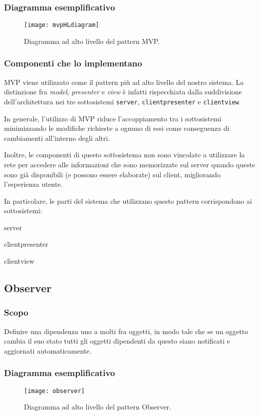 \subsubsection{Diagramma esemplificativo}
\begin{figure}[h]
\centering
\texttt{[image: mvpHLdiagram]}
\caption{Diagramma ad alto livello del pattern MVP.}\label{fig:mvpHL}
\end{figure}

\subsubsection{Componenti che lo implementano}
MVP viene utilizzato come il pattern più ad alto livello del nostro sistema. La distinzione fra \textit{model}, \textit{presenter} e \textit{view} è infatti rispecchiata dalla suddivisione dell'architettura nei tre sottosistemi \texttt{server}, \texttt{clientpresenter} e \texttt{clientview}.

In generale, l'utilizzo di MVP riduce l'accoppiamento tra i sottosistemi minimizzando le modifiche richieste a ognuno di essi come conseguenza di cambiamenti all'interno degli altri.

Inoltre, le componenti di questo sottosistema non sono vincolate a utilizzare la rete per accedere alle informazioni che sono memorizzate sul server quando queste sono già disponibili (e possono essere elaborate) sul client, migliorando l'esperienza utente.

In particolare, le parti del sistema che utilizzano questo pattern corrispondono ai sottosistemi:
\begin{description}
  \item{\ttfamily server}
  \item{\ttfamily clientpresenter}
  \item{\ttfamily clientview} 
\end{description}

\subsection{Observer}
\subsubsection{Scopo}
Definire una dipendenza uno a molti fra oggetti, in modo tale che se un oggetto cambia il suo stato tutti gli oggetti dipendenti da questo siano notificati e aggiornati automaticamente.
\subsubsection{Diagramma esemplificativo}
\begin{figure}[h]
\centering
\texttt{[image: observer]}
\caption{Diagramma ad alto livello del pattern Observer.}\label{fig:observer}
\end{figure}
